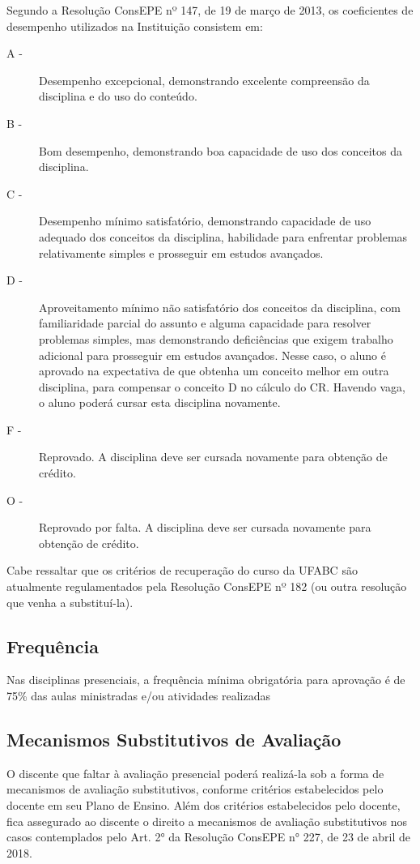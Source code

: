 Segundo a Resolução ConsEPE nº 147, de 19 de março de 2013, os coeficientes de
desempenho utilizados na Instituição consistem em:
\begin{description}
    \item[A -] Desempenho excepcional, demonstrando excelente compreensão da
    disciplina e do uso do conteúdo.
    \item[B -] Bom desempenho, demonstrando boa capacidade de uso dos conceitos
    da disciplina.
    \item[C -] Desempenho mínimo satisfatório, demonstrando capacidade de uso
    adequado dos conceitos da disciplina, habilidade para enfrentar problemas
    relativamente simples e prosseguir em estudos avançados.
    \item[D -] Aproveitamento mínimo não satisfatório dos conceitos da
    disciplina, com familiaridade parcial do assunto e alguma capacidade para
    resolver problemas simples, mas demonstrando deficiências que exigem
    trabalho adicional para prosseguir em estudos avançados. Nesse caso, o
    aluno é aprovado na expectativa de que obtenha um conceito melhor em outra
    disciplina, para compensar o conceito D no cálculo do CR. Havendo vaga, o
    aluno poderá cursar esta disciplina novamente.
    \item[F -] Reprovado. A disciplina deve ser cursada novamente para obtenção
    de crédito.
    \item[O -] Reprovado por falta. A disciplina deve ser cursada novamente
    para obtenção de crédito.
\end{description}


Cabe ressaltar que os critérios de recuperação do curso da UFABC são atualmente
regulamentados pela Resolução ConsEPE nº 182 (ou outra resolução que venha a
substituí-la).

\subsection{Frequência}
Nas disciplinas presenciais, a frequência mínima obrigatória para aprovação é de
75\% das aulas ministradas e/ou atividades realizadas

\subsection{Mecanismos Substitutivos de Avaliação}
O discente que faltar à avaliação presencial poderá realizá-la sob a forma de
mecanismos de avaliação substitutivos, conforme critérios estabelecidos pelo docente
em seu Plano de Ensino. Além dos critérios estabelecidos pelo docente, fica
assegurado ao discente o direito a mecanismos de avaliação substitutivos nos casos
contemplados pelo Art. 2° da Resolução ConsEPE n° 227, de 23 de abril de 2018.

